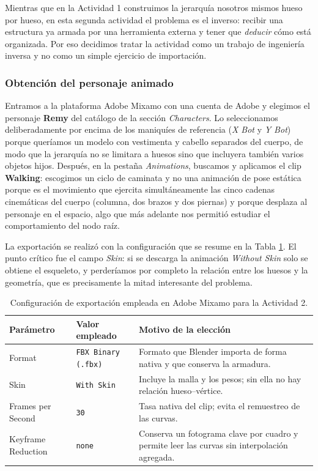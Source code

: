 Mientras que en la Actividad 1 construimos la jerarquía nosotros mismos hueso por hueso, en esta segunda actividad el problema es el inverso: recibir una estructura ya armada por una herramienta externa y tener que \textit{deducir} cómo está organizada. Por eso decidimos tratar la actividad como un trabajo de ingeniería inversa y no como un simple ejercicio de importación.

\subsubsection{Obtención del personaje animado}
Entramos a la plataforma Adobe Mixamo con una cuenta de Adobe y elegimos el personaje \textbf{Remy} del catálogo de la sección \textit{Characters}. Lo seleccionamos deliberadamente por encima de los maniquíes de referencia (\textit{X Bot} y \textit{Y Bot}) porque queríamos un modelo con vestimenta y cabello separados del cuerpo, de modo que la jerarquía no se limitara a huesos sino que incluyera también varios objetos hijos. Después, en la pestaña \textit{Animations}, buscamos y aplicamos el clip \textbf{Walking}: escogimos un ciclo de caminata y no una animación de pose estática porque es el movimiento que ejercita simultáneamente las cinco cadenas cinemáticas del cuerpo (columna, dos brazos y dos piernas) y porque desplaza al personaje en el espacio, algo que más adelante nos permitió estudiar el comportamiento del nodo raíz.

La exportación se realizó con la configuración que se resume en la Tabla \ref{tab:mixamo_export}. El punto crítico fue el campo \textit{Skin}: si se descarga la animación \textit{Without Skin} solo se obtiene el esqueleto, y perderíamos por completo la relación entre los huesos y la geometría, que es precisamente la mitad interesante del problema.

\begin{table}[H]
\centering
\begin{tabular}{@{}p{4.5cm}p{5.0cm}p{5.5cm}@{}}
\toprule
\textbf{Parámetro} & \textbf{Valor empleado} & \textbf{Motivo de la elección} \\
\midrule
Format              & \texttt{FBX Binary (.fbx)} & Formato que Blender importa de forma nativa y que conserva la armadura. \\
Skin                & \texttt{With Skin}         & Incluye la malla y los pesos; sin ella no hay relación hueso--vértice. \\
Frames per Second   & \texttt{30}                & Tasa nativa del clip; evita el remuestreo de las curvas. \\
Keyframe Reduction  & \texttt{none}              & Conserva un fotograma clave por cuadro y permite leer las curvas sin interpolación agregada. \\
\bottomrule
\end{tabular}
\caption{Configuración de exportación empleada en Adobe Mixamo para la Actividad 2.}
\label{tab:mixamo_export}
\end{table}

